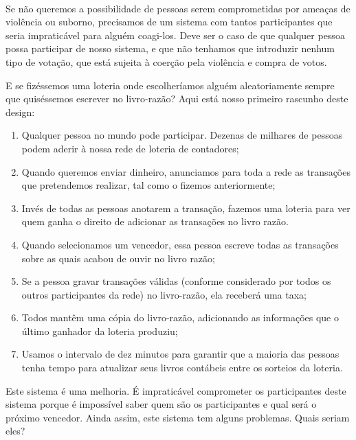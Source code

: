 \paragraph{}
Se não queremos a possibilidade de pessoas serem comprometidas por ameaças de violência ou suborno, precisamos de um sistema com tantos participantes que seria impraticável para alguém coagi-los. Deve ser o caso de que qualquer pessoa possa participar de nosso sistema, e que não tenhamos que introduzir nenhum tipo de votação, que está sujeita à coerção pela violência e compra de votos.

E se fizéssemos uma loteria onde escolheríamos alguém aleatoriamente sempre que quiséssemos escrever no livro-razão? Aqui está nosso primeiro rascunho deste design:

\begin{samepage}
\begin{enumerate}
\item Qualquer pessoa no mundo pode participar. Dezenas de milhares de pessoas podem aderir à nossa rede de loteria de contadores;
\item Quando queremos enviar dinheiro, anunciamos para toda a rede as transações que pretendemos realizar, tal como o fizemos anteriormente;
\item Invés de todas as pessoas anotarem a transação, fazemos uma loteria para ver quem ganha o direito de adicionar as transações no livro razão.
\item Quando selecionamos um vencedor, essa pessoa escreve todas as transações sobre as quais acabou de ouvir no livro razão;
\item Se a pessoa gravar transações válidas (conforme considerado por todos os outros participantes da rede) no livro-razão, ela receberá uma taxa;
\item Todos mantêm uma cópia do livro-razão, adicionando as informações que o último ganhador da loteria produziu;
\item Usamos o intervalo de dez minutos para garantir que a maioria das pessoas tenha tempo para atualizar seus livros contábeis entre os sorteios da loteria.
\end{enumerate}
\end{samepage}

Este sistema é uma melhoria. É impraticável comprometer os participantes deste sistema porque é impossível saber quem são os participantes e qual será o próximo vencedor. Ainda assim, este sistema tem alguns problemas. Quais seriam eles?
\newpage

